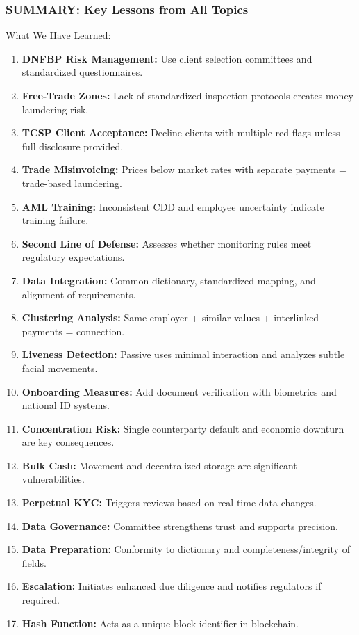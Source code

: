 \documentclass[12pt,aspectratio=169]{beamer}
\renewcommand{\footnotesize}{\fontsize{7}{8}\selectfont}
\renewcommand{\small}{\fontsize{8}{9}\selectfont}
\begin{document}
	\begin{frame}
		\frametitle{\fontsize{14}{17}\selectfont SUMMARY: Key Lessons from All Topics}
		
		\small
		\begin{block}{\fontsize{11}{13}\selectfont What We Have Learned:}
			\footnotesize
			\begin{enumerate}
				\item \textbf{DNFBP Risk Management:} Use client selection committees and standardized questionnaires.
				\item \textbf{Free-Trade Zones:} Lack of standardized inspection protocols creates money laundering risk.
				\item \textbf{TCSP Client Acceptance:} Decline clients with multiple red flags unless full disclosure provided.
				\item \textbf{Trade Misinvoicing:} Prices below market rates with separate payments = trade-based laundering.
				\item \textbf{AML Training:} Inconsistent CDD and employee uncertainty indicate training failure.
				\item \textbf{Second Line of Defense:} Assesses whether monitoring rules meet regulatory expectations.
				\item \textbf{Data Integration:} Common dictionary, standardized mapping, and alignment of requirements.
				\item \textbf{Clustering Analysis:} Same employer + similar values + interlinked payments = connection.
				\item \textbf{Liveness Detection:} Passive uses minimal interaction and analyzes subtle facial movements.
				\item \textbf{Onboarding Measures:} Add document verification with biometrics and national ID systems.
				\item \textbf{Concentration Risk:} Single counterparty default and economic downturn are key consequences.
				\item \textbf{Bulk Cash:} Movement and decentralized storage are significant vulnerabilities.
				\item \textbf{Perpetual KYC:} Triggers reviews based on real-time data changes.
				\item \textbf{Data Governance:} Committee strengthens trust and supports precision.
				\item \textbf{Data Preparation:} Conformity to dictionary and completeness/integrity of fields.
				\item \textbf{Escalation:} Initiates enhanced due diligence and notifies regulators if required.
				\item \textbf{Hash Function:} Acts as a unique block identifier in blockchain.
			\end{enumerate}
		\end{block}
		

\end{frame}
\end{document}
